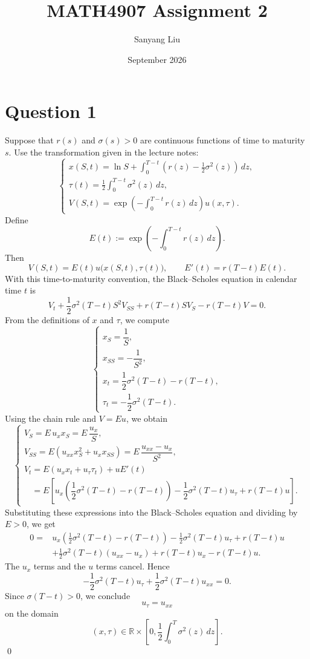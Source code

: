 \documentclass{article}
\title{MATH4907 Assignment 2}
\author{Sanyang Liu}
\date{September 2026}
\begin{document}
\maketitle

\section*{Question 1}

Suppose that \(r(s)\) and \(\sigma(s)>0\) are continuous
functions of time to maturity \(s\). Use the transformation
given in the lecture notes:
\begin{equation*}
    \begin{cases}
        x(S,t)=\ln S+
        \displaystyle\int_0^{T-t}
        \left(r(z)-\frac12\sigma^2(z)\right)\,dz, \\[6pt]
        \tau(t)=\displaystyle\frac12
        \int_0^{T-t}\sigma^2(z)\,dz, \\[6pt]
        V(S,t)=
        \exp\left(-\displaystyle\int_0^{T-t}r(z)\,dz\right)
        u(x,\tau).
    \end{cases}
\end{equation*}
Define
\[
E(t):=\exp\left(-\int_0^{T-t}r(z)\,dz\right).
\]
Then
\[
V(S,t)=E(t)u\bigl(x(S,t),\tau(t)\bigr),
\qquad E'(t)=r(T-t)E(t).
\]
With this time-to-maturity convention, the Black--Scholes
equation in calendar time \(t\) is
\[
V_t+\frac12\sigma^2(T-t)S^2V_{SS}
+r(T-t)SV_S-r(T-t)V=0.
\]
From the definitions of \(x\) and \(\tau\), we compute
\[
\begin{cases}
x_S=\dfrac1S, \\[6pt]
x_{SS}=-\dfrac1{S^2}, \\[6pt]
x_t=\dfrac12\sigma^2(T-t)-r(T-t), \\[6pt]
\tau_t=-\dfrac12\sigma^2(T-t).
\end{cases}
\]
Using the chain rule and \(V=Eu\), we obtain
\[
\begin{cases}
V_S=E\,u_x x_S
    =E\,\dfrac{u_x}{S}, \\[8pt]
V_{SS}
=E\left(u_{xx}x_S^2+u_xx_{SS}\right)
=E\,\dfrac{u_{xx}-u_x}{S^2}, \\[8pt]
V_t=E\left(u_xx_t+u_\tau\tau_t\right)+uE'(t)\\[4pt]
\phantom{V_t}
=E\left[
u_x\left(\dfrac12\sigma^2(T-t)-r(T-t)\right)
-\dfrac12\sigma^2(T-t)u_\tau
+r(T-t)u
\right].
\end{cases}
\]
Substituting these expressions into the Black--Scholes
equation and dividing by \(E>0\), we get
\[
\begin{aligned}
0={}&
u_x\left(\frac12\sigma^2(T-t)-r(T-t)\right)
-\frac12\sigma^2(T-t)u_\tau+r(T-t)u\\
&+\frac12\sigma^2(T-t)(u_{xx}-u_x)
+r(T-t)u_x-r(T-t)u.
\end{aligned}
\]
The \(u_x\) terms and the \(u\) terms cancel. Hence
\[
-\frac12\sigma^2(T-t)u_\tau
+\frac12\sigma^2(T-t)u_{xx}=0.
\]
Since \(\sigma(T-t)>0\), we conclude
\[
\boxed{u_\tau=u_{xx}}
\]
on the domain
\[
(x,\tau)\in\mathbb R\times
\left[0,\frac12\int_0^T\sigma^2(z)\,dz\right].
\]
\qed
\end{document}
